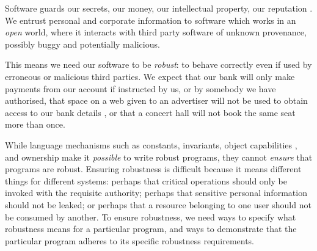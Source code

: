 Software guards our secrets, our money, our intellectual property,
our reputation \cite{covern}.  We entrust personal and
corporate information to software which works in an \emph{open} world, 
where  it interacts with 
third party software of unknown provenance, possibly buggy and potentially malicious.

This means we need our software to be \emph{robust}:
to behave correctly even if  used 
by erroneous or malicious third parties.
We expect that our bank will only make payments 
from our account if instructed by us, or by somebody we have authorised, 
that space on a web given to an advertiser will not be used
to obtain access to our bank details \cite{cwe}, or that a
concert hall will not book the same seat more than once.



While language mechanisms such as constants, invariants, 
object capabilities \cite{MillerPhD}, and 
ownership \cite{ownalias} 
make it \textit{possible} to write robust
programs, they cannot \textit{ensure} that programs are robust.
Ensuring robustness is difficult because it means 
different things for different systems: perhaps
that critical operations should only be invoked with the requisite authority;
perhaps that sensitive personal information should not be leaked; 
or perhaps that a resource belonging to one user should not be consumed by another.
%
To ensure robustness, we need ways to specify what robustness means for a 
particular program, and ways to demonstrate that the particular program 
adheres to its specific robustness requirements.

